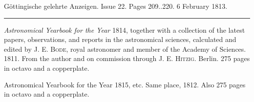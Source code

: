 \clearpage
{}
\hypertarget{native-553-lower}{}\label{native-553-lower}
\begin{center}\small Göttingische gelehrte Anzeigen. Issue 22. Pages 209..220. 6 February 1813.\\[3pt]\rule{.72\linewidth}{.3pt}\end{center}

\emph{Astronomical Yearbook for the Year} 1814, together with a collection of the latest papers, observations, and reports in the astronomical sciences, calculated and edited by J. E. \textsc{Bode}, royal astronomer and member of the Academy of Sciences. 1811. From the author and on commission through J. E. \textsc{Hitzig}. Berlin. 275 pages in octavo and a copperplate.

Astronomical Yearbook for the Year 1815, etc. Same place, 1812. Also 275 pages in octavo and a copperplate.

